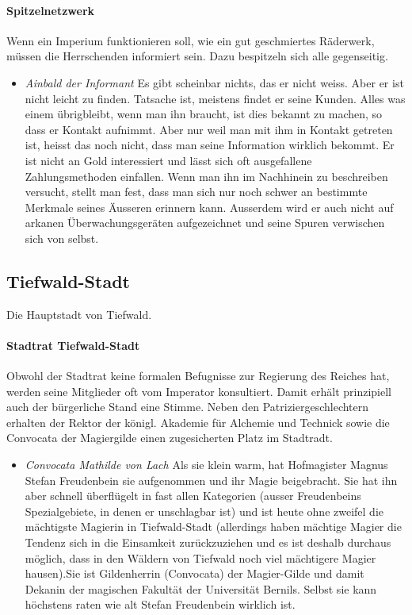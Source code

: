 \documentclass[10pt,twoside,twocolumn,openany]{book}
\begin{document}
\begin{multicols}{2}
	\paragraph{Spitzelnetzwerk} Wenn ein Imperium funktionieren soll, wie ein gut geschmiertes Räderwerk, müssen die Herrschenden informiert sein. Dazu bespitzeln sich alle gegenseitig.
	\begin{itemize}
		\item\textit{Ainbald der Informant} Es gibt scheinbar nichts, das er nicht weiss. Aber er ist nicht leicht zu finden. Tatsache ist, meistens findet er seine Kunden. Alles was einem übrigbleibt, wenn man ihn braucht, ist dies bekannt zu machen, so dass er Kontakt aufnimmt. Aber nur weil man mit ihm in Kontakt getreten ist, heisst das noch nicht, dass man seine Information wirklich bekommt. Er ist nicht an Gold interessiert und lässt sich oft ausgefallene Zahlungsmethoden einfallen.
		Wenn man ihn im Nachhinein zu beschreiben versucht, stellt man fest, dass man sich nur noch schwer an bestimmte Merkmale seines Äusseren erinnern kann. Ausserdem wird er auch nicht auf arkanen Überwachungsgeräten aufgezeichnet und seine Spuren verwischen sich von selbst.
	\end{itemize}
	
	
	
	\subsection{Tiefwald-Stadt}
	
	Die Hauptstadt von Tiefwald.
	
	\paragraph{Stadtrat Tiefwald-Stadt} Obwohl der Stadtrat keine formalen Befugnisse zur Regierung des Reiches hat, werden seine Mitglieder oft vom Imperator konsultiert. Damit erhält prinzipiell auch der bürgerliche Stand eine Stimme. Neben den Patriziergeschlechtern erhalten der Rektor der königl. Akademie für Alchemie und Technick sowie die Convocata der Magiergilde einen zugesicherten Platz im Stadtradt.
		\begin{itemize}
		\item\textit{Convocata Mathilde von Lach} Als sie klein warm, hat Hofmagister Magnus Stefan Freudenbein sie aufgenommen und ihr Magie beigebracht. Sie hat ihn aber schnell überflügelt in fast allen Kategorien (ausser Freudenbeins Spezialgebiete, in denen er unschlagbar ist) und ist heute ohne zweifel die mächtigste Magierin in Tiefwald-Stadt (allerdings haben mächtige Magier die Tendenz sich in die Einsamkeit zurückzuziehen und es ist deshalb durchaus möglich, dass in den Wäldern von Tiefwald noch viel mächtigere Magier hausen).Sie ist Gildenherrin (Convocata) der Magier-Gilde und damit Dekanin der magischen Fakultät der Universität Bernils.
		Selbst sie kann höchstens raten wie alt Stefan Freudenbein wirklich ist.
	\end{itemize}
	

\end{multicols}
\end{document}
